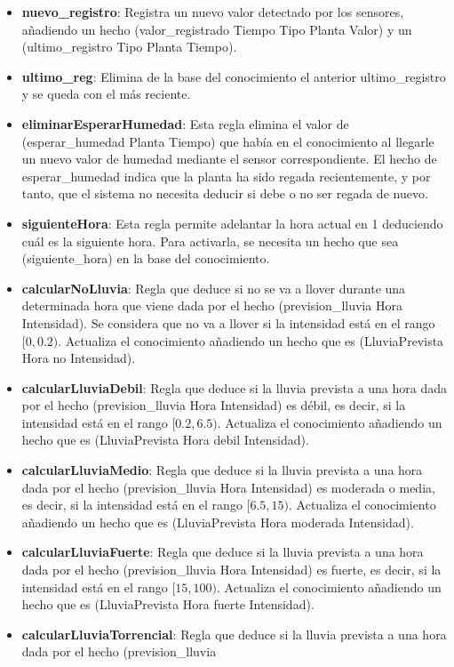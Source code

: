 \documentclass[11pt,a4paper]{article}
\begin{document}
\begin{itemize}
	\item \textbf{nuevo\_registro}: Registra un nuevo valor detectado por los sensores, añadiendo un hecho (valor\_registrado Tiempo
	Tipo Planta Valor) y un (ultimo\_registro Tipo Planta Tiempo).
	\item \textbf{ultimo\_reg}: Elimina de la base del conocimiento el anterior ultimo\_registro y se queda con el más reciente.
	\item \textbf{eliminarEsperarHumedad}: Esta regla elimina el valor de (esperar\_humedad Planta Tiempo) que había en el
	conocimiento al llegarle un nuevo valor de humedad mediante el sensor correspondiente. El hecho de esperar\_humedad indica que
	la planta ha sido regada recientemente, y por tanto, que el sistema no necesita deducir si debe o no ser regada de nuevo.
	\item \textbf{siguienteHora}: Esta regla permite adelantar la hora actual en 1 deduciendo cuál es la siguiente hora. Para
	activarla, se necesita un hecho que sea (siguiente\_hora) en la base del conocimiento.
	\item \textbf{calcularNoLluvia}: Regla que deduce si no se va a llover durante una determinada hora que viene dada por el hecho
	(prevision\_lluvia Hora Intensidad). Se considera que no va a llover si la intensidad está en el rango $[0, 0.2)$. Actualiza el
	conocimiento añadiendo un hecho que es (LluviaPrevista Hora no Intensidad).
	\item \textbf{calcularLluviaDebil}: Regla que deduce si la lluvia prevista a una hora dada por el hecho (prevision\_lluvia Hora
	Intensidad) es débil, es decir, si la intensidad está en el rango $[0.2, 6.5)$. Actualiza el conocimiento añadiendo un hecho que
	es (LluviaPrevista Hora debil Intensidad).
	\item \textbf{calcularLluviaMedio}: Regla que deduce si la lluvia prevista a una hora dada por el hecho (prevision\_lluvia Hora
	Intensidad) es moderada o media, es decir, si la intensidad está en el rango $[6.5, 15)$. Actualiza el conocimiento añadiendo un
	hecho que es (LluviaPrevista Hora moderada Intensidad).
	\item \textbf{calcularLluviaFuerte}: Regla que deduce si la lluvia prevista a una hora dada por el hecho (prevision\_lluvia Hora
	Intensidad) es fuerte, es decir, si la intensidad está en el rango $[15, 100)$. Actualiza el conocimiento añadiendo un
	hecho que es (LluviaPrevista Hora fuerte Intensidad).
	\item \textbf{calcularLluviaTorrencial}: Regla que deduce si la lluvia prevista a una hora dada por el hecho (prevision\_lluvia

\end{itemize}
\end{document}
